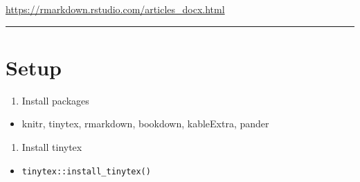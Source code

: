 \documentclass[]{article}
\providecommand{\tightlist}{%
  \setlength{\itemsep}{0pt}\setlength{\parskip}{0pt}}
\begin{document}
\url{https://rmarkdown.rstudio.com/articles_docx.html}

\begin{center}\rule{0.5\linewidth}{\linethickness}\end{center}

\hypertarget{setup}{%
\section{Setup}\label{setup}}

\begin{enumerate}
\def\labelenumi{\arabic{enumi}.}
\tightlist
\item
  Install packages
\end{enumerate}

\begin{itemize}
\tightlist
\item
  knitr, tinytex, rmarkdown, bookdown, kableExtra, pander
\end{itemize}

\begin{enumerate}
\def\labelenumi{\arabic{enumi}.}
\setcounter{enumi}{1}
\tightlist
\item
  Install tinytex
\end{enumerate}

\begin{itemize}
\tightlist
\item
  \texttt{tinytex::install\_tinytex()}
\end{itemize}
\end{document}

